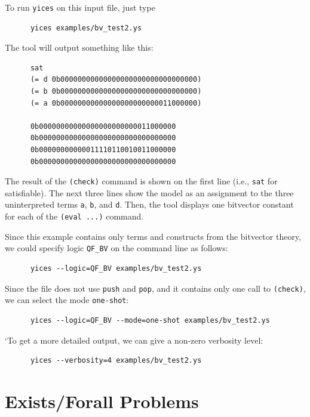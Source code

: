 \documentclass[11pt,twoside,fleqn,openright,titlepage]{cslreport}
\begin{document}
\medskip\noindent
To run \texttt{yices} on this input file, just type
\begin{small}
\begin{verbatim}
      yices examples/bv_test2.ys
\end{verbatim}
\end{small}
The tool will output something like this:
\begin{small}
\begin{verbatim}
      sat
      (= d 0b00000000000000000000000000000000)
      (= b 0b00000000000000000000000000000000)
      (= a 0b00000000000000000000000011000000)

      0b00000000000000000000000011000000
      0b00000000000000000000000000000000
      0b00000000000011110110010011000000
      0b00000000000000000000000000000000
\end{verbatim}
\end{small}
The result of the \texttt{(check)}  command is shown on the first line
(i.e., \texttt{sat}  for satisfiable). The  next three lines  show the
model as  an assignment to  the three uninterpreted  terms \texttt{a},
\texttt{b},  and \texttt{d}.  Then,  the tool  displays one  bitvector
constant for each of the \texttt{(eval ...)} command.

\medskip\noindent
Since  this  example  contains  only  terms and  constructs  from  the
bitvector  theory,  we  could  specify logic  \texttt{QF\_BV}  on  the
command line as follows:
\begin{small}
\begin{verbatim}
      yices --logic=QF_BV examples/bv_test2.ys
\end{verbatim}
\end{small}
Since the file does not use \texttt{push} and \texttt{pop}, and it
contains only one call to \texttt{(check)}, we can select the mode
\texttt{one-shot}:
\begin{small}
\begin{verbatim}
      yices --logic=QF_BV --mode=one-shot examples/bv_test2.ys
\end{verbatim}
\end{small}
`To get a more detailed output, we can give a non-zero verbosity level:
\begin{small}
\begin{verbatim}
      yices --verbosity=4 examples/bv_test2.ys
\end{verbatim}
\end{small}

\section{Exists/Forall Problems}
\end{document}
